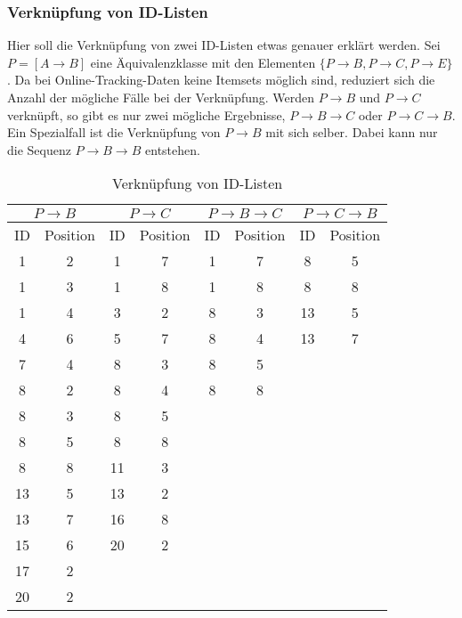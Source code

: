 \subsubsection*{Verknüpfung von ID-Listen}
Hier soll die Verknüpfung von zwei ID-Listen etwas genauer erklärt werden. Sei $P = [A\rightarrow B]$ eine Äquivalenzklasse mit den Elementen $\{P\rightarrow B,P\rightarrow C,P\rightarrow E \}$. Da bei Online-Tracking-Daten keine Itemsets möglich sind, reduziert sich die Anzahl der mögliche Fälle bei der Verknüpfung. Werden $P\rightarrow B$ und $P\rightarrow C$ verknüpft, so gibt es nur zwei mögliche Ergebnisse, $P\rightarrow B\rightarrow C$ oder $P\rightarrow C\rightarrow B$. Ein Spezialfall ist die Verknüpfung von $P\rightarrow B$ mit sich selber. Dabei kann nur die Sequenz $P\rightarrow B\rightarrow B$ entstehen.\\
\begin{table}[hbt]
\centering
\begin{tabular}{c|c||c|c||c|c||c|c}
\multicolumn{2}{c||}{$P\rightarrow B$} & \multicolumn{2}{c||}{$P\rightarrow C$} & \multicolumn{2}{c||}{$P\rightarrow B\rightarrow C$} & \multicolumn{2}{c}{$P\rightarrow C\rightarrow B$}\\ \hline \hline
ID  & Position & ID  & Position & ID & Position & ID & Position \\ \hline
1   & 2				 & 1   & 7			  & 1  & 7        & 8	 & 5   		  \\
1   & 3				 & 1   & 8        & 1  & 8        & 8  & 8        \\
1   & 4				 & 3   & 2        & 8  & 3        & 13 & 5        \\
4   & 6				 & 5   & 7        & 8  & 4        & 13 & 7        \\
7   & 4				 & 8   & 3        & 8  & 5        &    &          \\
8   & 2				 & 8   & 4        & 8  & 8        &    &          \\
8   & 3				 & 8   & 5        &    &          &    &          \\
8   & 5				 & 8   & 8        &    &          &    &          \\
8   & 8				 & 11  & 3        &    &          &    &          \\
13  & 5				 & 13  & 2        &    &          &    &          \\
13  & 7				 & 16  & 8        &    &          &    &          \\
15  & 6				 & 20  & 2        &    &          &    &          \\
17  & 2				 &     &          &    &          &    &          \\
20  & 2				 & 	   & 				  &    & 	        & 	 &     	
\end{tabular}
\caption{Verknüpfung von ID-Listen}\label{join}
\end{table}
